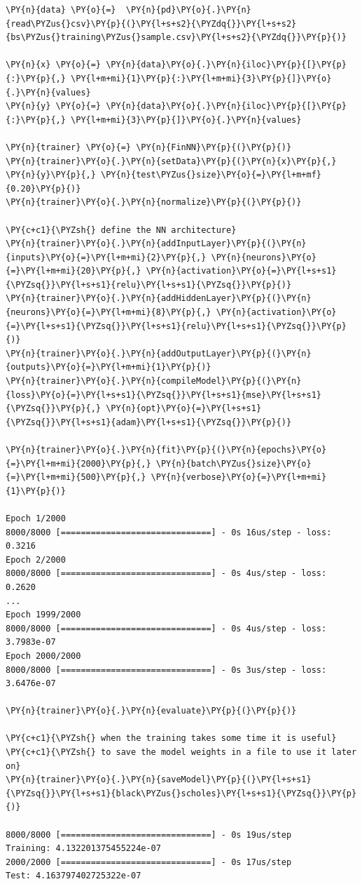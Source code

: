 \begin{tcolorbox}[breakable, size=fbox, boxrule=1pt, pad at break*=1mm,colback=cellbackground, colframe=cellborder]
\begin{Verbatim}[commandchars=\\\{\}]
\PY{n}{data} \PY{o}{=}  \PY{n}{pd}\PY{o}{.}\PY{n}{read\PYZus{}csv}\PY{p}{(}\PY{l+s+s2}{\PYZdq{}}\PY{l+s+s2}{bs\PYZus{}training\PYZus{}sample.csv}\PY{l+s+s2}{\PYZdq{}}\PY{p}{)}
	
\PY{n}{x} \PY{o}{=} \PY{n}{data}\PY{o}{.}\PY{n}{iloc}\PY{p}{[}\PY{p}{:}\PY{p}{,} \PY{l+m+mi}{1}\PY{p}{:}\PY{l+m+mi}{3}\PY{p}{]}\PY{o}{.}\PY{n}{values}
\PY{n}{y} \PY{o}{=} \PY{n}{data}\PY{o}{.}\PY{n}{iloc}\PY{p}{[}\PY{p}{:}\PY{p}{,} \PY{l+m+mi}{3}\PY{p}{]}\PY{o}{.}\PY{n}{values}

\PY{n}{trainer} \PY{o}{=} \PY{n}{FinNN}\PY{p}{(}\PY{p}{)}
\PY{n}{trainer}\PY{o}{.}\PY{n}{setData}\PY{p}{(}\PY{n}{x}\PY{p}{,} \PY{n}{y}\PY{p}{,} \PY{n}{test\PYZus{}size}\PY{o}{=}\PY{l+m+mf}{0.20}\PY{p}{)}
\PY{n}{trainer}\PY{o}{.}\PY{n}{normalize}\PY{p}{(}\PY{p}{)}
	
\PY{c+c1}{\PYZsh{} define the NN architecture}
\PY{n}{trainer}\PY{o}{.}\PY{n}{addInputLayer}\PY{p}{(}\PY{n}{inputs}\PY{o}{=}\PY{l+m+mi}{2}\PY{p}{,} \PY{n}{neurons}\PY{o}{=}\PY{l+m+mi}{20}\PY{p}{,} \PY{n}{activation}\PY{o}{=}\PY{l+s+s1}{\PYZsq{}}\PY{l+s+s1}{relu}\PY{l+s+s1}{\PYZsq{}}\PY{p}{)}
\PY{n}{trainer}\PY{o}{.}\PY{n}{addHiddenLayer}\PY{p}{(}\PY{n}{neurons}\PY{o}{=}\PY{l+m+mi}{8}\PY{p}{,} \PY{n}{activation}\PY{o}{=}\PY{l+s+s1}{\PYZsq{}}\PY{l+s+s1}{relu}\PY{l+s+s1}{\PYZsq{}}\PY{p}{)}
\PY{n}{trainer}\PY{o}{.}\PY{n}{addOutputLayer}\PY{p}{(}\PY{n}{outputs}\PY{o}{=}\PY{l+m+mi}{1}\PY{p}{)}
\PY{n}{trainer}\PY{o}{.}\PY{n}{compileModel}\PY{p}{(}\PY{n}{loss}\PY{o}{=}\PY{l+s+s1}{\PYZsq{}}\PY{l+s+s1}{mse}\PY{l+s+s1}{\PYZsq{}}\PY{p}{,} \PY{n}{opt}\PY{o}{=}\PY{l+s+s1}{\PYZsq{}}\PY{l+s+s1}{adam}\PY{l+s+s1}{\PYZsq{}}\PY{p}{)}
	
\PY{n}{trainer}\PY{o}{.}\PY{n}{fit}\PY{p}{(}\PY{n}{epochs}\PY{o}{=}\PY{l+m+mi}{2000}\PY{p}{,} \PY{n}{batch\PYZus{}size}\PY{o}{=}\PY{l+m+mi}{500}\PY{p}{,} \PY{n}{verbose}\PY{o}{=}\PY{l+m+mi}{1}\PY{p}{)}

Epoch 1/2000
8000/8000 [==============================] - 0s 16us/step - loss: 0.3216
Epoch 2/2000
8000/8000 [==============================] - 0s 4us/step - loss: 0.2620
...
Epoch 1999/2000
8000/8000 [==============================] - 0s 4us/step - loss: 3.7983e-07
Epoch 2000/2000
8000/8000 [==============================] - 0s 3us/step - loss: 3.6476e-07

\PY{n}{trainer}\PY{o}{.}\PY{n}{evaluate}\PY{p}{(}\PY{p}{)}
	
\PY{c+c1}{\PYZsh{} when the training takes some time it is useful}
\PY{c+c1}{\PYZsh{} to save the model weights in a file to use it later on}
\PY{n}{trainer}\PY{o}{.}\PY{n}{saveModel}\PY{p}{(}\PY{l+s+s1}{\PYZsq{}}\PY{l+s+s1}{black\PYZus{}scholes}\PY{l+s+s1}{\PYZsq{}}\PY{p}{)}

8000/8000 [==============================] - 0s 19us/step
Training: 4.132201375455224e-07
2000/2000 [==============================] - 0s 17us/step
Test: 4.163797402725322e-07
\end{Verbatim}
\end{tcolorbox}

